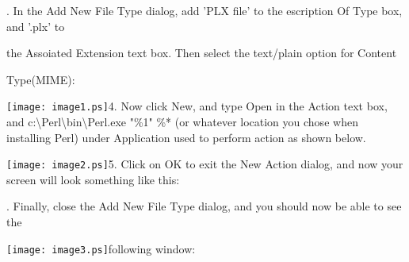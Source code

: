 \documentclass[a4paper,11pt]{book}
\begin{document}
\noindent 

.   In the Add New File Type dialog, add 'PLX file' to the escription Of Type box, and '.plx' to

\noindent the Assoiated Extension text box. Then select the text/plain option for Content

\noindent Type(MIME):

\noindent 

\noindent \texttt{[image: image1.ps]}4.   Now click New, and type Open in the Action text box, and c:\textbackslash Perl\textbackslash bin\textbackslash Perl.exe "\%1" \%* (or whatever location you chose when installing Perl) under Application used to perform action as shown below.

\noindent 

\noindent 

\noindent 

\noindent 

\noindent \texttt{[image: image2.ps]}5.   Click on OK to exit the New Action dialog, and now your screen will look something like this:

\noindent 

\noindent 

.   Finally,  close the Add New File Type dialog,  and  you  should  now  be  able  to  see the

\noindent \texttt{[image: image3.ps]}following window:

\noindent 

\noindent 

\noindent 

\noindent 

\noindent 

\noindent 

\noindent 

\noindent 

\noindent 

\noindent 

\noindent 

\noindent 

\noindent 

\noindent 

\noindent 

\noindent 
\end{document}
